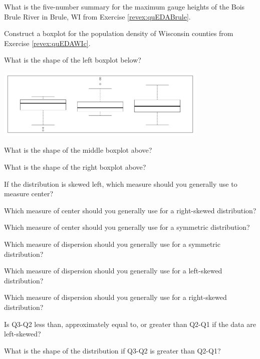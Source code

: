 \documentclass[10pt,openany]{book}\usepackage[]{graphicx}\usepackage[]{color}
\begin{document}
\newpage
\begin{exsection}
  \item \label{revex:quEDABrule5N} What is the five-number summary for the maximum gauge heights of the Bois Brule River in Brule, WI from Exercise \ref{revex:quEDABrule}. 
  \item \label{revex:quEDAWI5N} \rhw{} Construct a boxplot for the population density of Wisconsin counties from Exercise \ref{revex:quEDAWIc}. 
  \item \label{revex:quEDABoxLeft} What is the shape of the left boxplot below? 

\begin{center}
  \includegraphics[width=4in]{Figs/BoxplotQuest-1}
\end{center}

  \item \label{revex:quEDABoxRight} What is the shape of the middle boxplot above? 
  \item \label{revex:quEDABoxSym} What is the shape of the right boxplot above? 
  \item \label{revex:quEDALSkewCtr} If the distribution is skewed left, which measure should you generally use to measure center? 
  \item \label{revex:quEDARSkewCtr} Which measure of center should you generally use for a right-skewed distribution? 
  \item \label{revex:quEDASymCtr} Which measure of center should you generally use for a symmetric distribution? 
  \item \label{revex:quEDASymDisp} Which measure of dispersion should you generally use for a symmetric distribution? 
  \item \label{revex:quEDALSkewDisp} Which measure of dispersion should you generally use for a left-skewed distribution? 
  \item \label{revex:quEDARSkewDisp} Which measure of dispersion should you generally use for a right-skewed distribution? 
  \item \label{revex:quEDAQShape1} Is Q3-Q2 less than, approximately equal to, or greater than Q2-Q1 if the data are left-skewed? 
  \item \label{revex:quEDAQShape2} What is the shape of the distribution if Q3-Q2 is greater than Q2-Q1? 
\end{exsection}
\end{document}

